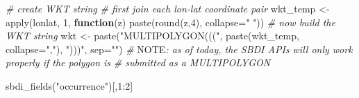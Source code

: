 \documentclass[
  10pt,
]{article}
\newenvironment{Shaded}{\begin{snugshade}}{\end{snugshade}}
\newcommand{\AlertTok}[1]{\textcolor[rgb]{0.94,0.16,0.16}{#1}}
\newcommand{\AttributeTok}[1]{\textcolor[rgb]{0.77,0.63,0.00}{#1}}
\newcommand{\CommentTok}[1]{\textcolor[rgb]{0.56,0.35,0.01}{\textit{#1}}}
\newcommand{\ControlFlowTok}[1]{\textcolor[rgb]{0.13,0.29,0.53}{\textbf{#1}}}
\newcommand{\DecValTok}[1]{\textcolor[rgb]{0.00,0.00,0.81}{#1}}
\newcommand{\FunctionTok}[1]{\textcolor[rgb]{0.00,0.00,0.00}{#1}}
\newcommand{\NormalTok}[1]{#1}
\newcommand{\OtherTok}[1]{\textcolor[rgb]{0.56,0.35,0.01}{#1}}
\newcommand{\SpecialCharTok}[1]{\textcolor[rgb]{0.00,0.00,0.00}{#1}}
\newcommand{\StringTok}[1]{\textcolor[rgb]{0.31,0.60,0.02}{#1}}
\begin{document}
\begin{Shaded}
\begin{Highlighting}[]
\CommentTok{\# create WKT string}
\CommentTok{\# first join each lon{-}lat coordinate pair}
\NormalTok{wkt\_temp }\OtherTok{\textless{}{-}} \FunctionTok{apply}\NormalTok{(lonlat, }\DecValTok{1}\NormalTok{, }\ControlFlowTok{function}\NormalTok{(z) }\FunctionTok{paste}\NormalTok{(}\FunctionTok{round}\NormalTok{(z,}\DecValTok{4}\NormalTok{), }\AttributeTok{collapse=}\StringTok{" "}\NormalTok{))}
\CommentTok{\# now build the WKT string}
\NormalTok{wkt }\OtherTok{\textless{}{-}} \FunctionTok{paste}\NormalTok{(}\StringTok{"MULTIPOLYGON((("}\NormalTok{, }\FunctionTok{paste}\NormalTok{(wkt\_temp, }\AttributeTok{collapse=}\StringTok{","}\NormalTok{), }\StringTok{")))"}\NormalTok{, }\AttributeTok{sep=}\StringTok{""}\NormalTok{)}
\CommentTok{\# }\AlertTok{NOTE}\CommentTok{: as of today, the SBDI APIs will only work properly if the polygon is }
\CommentTok{\# submitted as a MULTIPOLYGON}
\end{Highlighting}
\end{Shaded}

\begin{Shaded}
\begin{Highlighting}[]
\FunctionTok{sbdi\_fields}\NormalTok{(}\StringTok{"occurrence"}\NormalTok{)[,}\DecValTok{1}\SpecialCharTok{:}\DecValTok{2}\NormalTok{]}
\end{Highlighting}
\end{Shaded}
\end{document}
